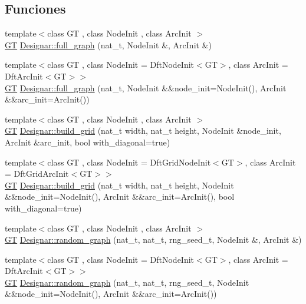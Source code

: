 \subsection*{Funciones}
\begin{DoxyCompactItemize}
\item 
{\footnotesize template$<$class GT , class Node\+Init , class Arc\+Init $>$ }\\\hyperlink{demo-buildgraph_8_c_a3001c40d2c31ca87ed96cd7d1334a55e}{GT} \hyperlink{namespace_designar_a8d424cb12f90b415f71463d919979437}{Designar\+::full\+\_\+graph} (nat\+\_\+t, Node\+Init \&, Arc\+Init \&)
\item 
{\footnotesize template$<$class GT , class Node\+Init  = Dft\+Node\+Init$<$\+G\+T$>$, class Arc\+Init  = Dft\+Arc\+Init$<$\+G\+T$>$$>$ }\\\hyperlink{demo-buildgraph_8_c_a3001c40d2c31ca87ed96cd7d1334a55e}{GT} \hyperlink{namespace_designar_aa06a68f735d6f8086fe2c5f4cd8062f1}{Designar\+::full\+\_\+graph} (nat\+\_\+t, Node\+Init \&\&node\+\_\+init=Node\+Init(), Arc\+Init \&\&arc\+\_\+init=Arc\+Init())
\item 
{\footnotesize template$<$class GT , class Node\+Init , class Arc\+Init $>$ }\\\hyperlink{demo-buildgraph_8_c_a3001c40d2c31ca87ed96cd7d1334a55e}{GT} \hyperlink{namespace_designar_aec5eb60a497214494947086c4cd7af76}{Designar\+::build\+\_\+grid} (nat\+\_\+t width, nat\+\_\+t height, Node\+Init \&node\+\_\+init, Arc\+Init \&arc\+\_\+init, bool with\+\_\+diagonal=true)
\item 
{\footnotesize template$<$class GT , class Node\+Init  = Dft\+Grid\+Node\+Init$<$\+G\+T$>$, class Arc\+Init  = Dft\+Grid\+Arc\+Init$<$\+G\+T$>$$>$ }\\\hyperlink{demo-buildgraph_8_c_a3001c40d2c31ca87ed96cd7d1334a55e}{GT} \hyperlink{namespace_designar_a57d0b4318f5ae1ef0082a67d7eeb10fe}{Designar\+::build\+\_\+grid} (nat\+\_\+t width, nat\+\_\+t height, Node\+Init \&\&node\+\_\+init=Node\+Init(), Arc\+Init \&\&arc\+\_\+init=Arc\+Init(), bool with\+\_\+diagonal=true)
\item 
{\footnotesize template$<$class GT , class Node\+Init , class Arc\+Init $>$ }\\\hyperlink{demo-buildgraph_8_c_a3001c40d2c31ca87ed96cd7d1334a55e}{GT} \hyperlink{namespace_designar_aee2e3d201a649a468dbe1def58fd285a}{Designar\+::random\+\_\+graph} (nat\+\_\+t, nat\+\_\+t, rng\+\_\+seed\+\_\+t, Node\+Init \&, Arc\+Init \&)
\item 
{\footnotesize template$<$class GT , class Node\+Init  = Dft\+Node\+Init$<$\+G\+T$>$, class Arc\+Init  = Dft\+Arc\+Init$<$\+G\+T$>$$>$ }\\\hyperlink{demo-buildgraph_8_c_a3001c40d2c31ca87ed96cd7d1334a55e}{GT} \hyperlink{namespace_designar_ae9fce2578ac6b598baf1ecb7e38f77cf}{Designar\+::random\+\_\+graph} (nat\+\_\+t, nat\+\_\+t, rng\+\_\+seed\+\_\+t, Node\+Init \&\&node\+\_\+init=Node\+Init(), Arc\+Init \&\&arc\+\_\+init=Arc\+Init())

\end{DoxyCompactItemize}
